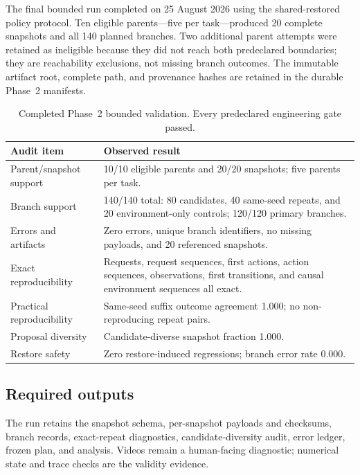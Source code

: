 The final bounded run completed on 25 August 2026 using the shared-restored policy protocol. Ten eligible parents---five per task---produced 20 complete snapshots and all 140 planned branches. Two additional parent attempts were retained as ineligible because they did not reach both predeclared boundaries; they are reachability exclusions, not missing branch outcomes. The immutable artifact root, complete path, and provenance hashes are retained in the durable Phase~2 manifests.

\begin{table}[H]
\centering
\caption{Completed Phase~2 bounded validation. Every predeclared engineering gate passed.}
\label{tab:phase2-completed}
\small
\begin{tabularx}{\textwidth}{P{0.34\textwidth}Y}
\toprule
Audit item & Observed result \\
\midrule
Parent/snapshot support & 10/10 eligible parents and 20/20 snapshots; five parents per task. \\
Branch support & 140/140 total: 80 candidates, 40 same-seed repeats, and 20 environment-only controls; 120/120 primary branches. \\
Errors and artifacts & Zero errors, unique branch identifiers, no missing payloads, and 20 referenced snapshots. \\
Exact reproducibility & Requests, request sequences, first actions, action sequences, observations, first transitions, and causal environment sequences all exact. \\
Practical reproducibility & Same-seed suffix outcome agreement 1.000; no non-reproducing repeat pairs. \\
Proposal diversity & Candidate-diverse snapshot fraction 1.000. \\
Restore safety & Zero restore-induced regressions; branch error rate 0.000. \\
\bottomrule
\end{tabularx}
\end{table}



\subsection{Required outputs}

The run retains the snapshot schema, per-snapshot payloads and checksums, branch records, exact-repeat diagnostics, candidate-diversity audit, error ledger, frozen plan, and analysis. Videos remain a human-facing diagnostic; numerical state and trace checks are the validity evidence.
